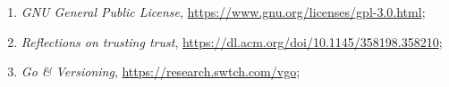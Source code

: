 \documentclass[a4paper,11pt]{article}
\begin{document}
\begin{enumerate}
\item \emph{GNU General Public License}, \href{https://www.gnu.org/licenses/gpl-3.0.html}{https://www.gnu.org/licenses/gpl-3.0.html};

\item \emph{Reflections on trusting trust}, \href{https://dl.acm.org/doi/10.1145/358198.358210}{https://dl.acm.org/doi/10.1145/358198.358210};

\item \emph{Go \& Versioning}, \href{https://research.swtch.com/vgo}{https://research.swtch.com/vgo};
























































\end{enumerate}











\end{document}
